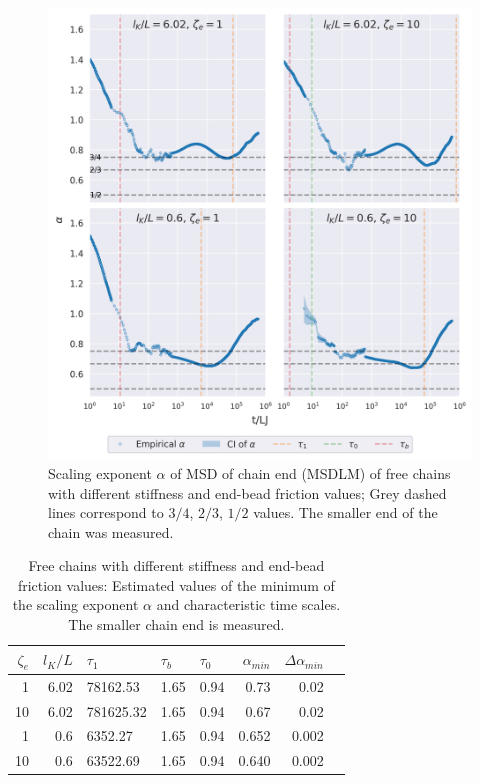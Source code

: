 \documentclass[
    paper=A4,pagesize=automedia,fontsize=12pt,
    BCOR=15mm,DIV=22,
    twoside,headinclude,footinclude=false,
    fleqn,             %
    bibliography=totocnumbered,          %
    listof=totoc,                %
    listof=flat,                 %
    cleardoublepage=empty      %
    numbers=endperiod
]{scrartcl}
\begin{document}
\begin{figure}
    \centering
    \includegraphics[width=\textwidth]{17+18+19+20-exp-alpha-fm.png}
    \caption{Scaling exponent $\alpha$ of MSD of chain end (MSDLM) 
    of free chains with different stiffness and end-bead friction values;
    Grey dashed lines correspond to $3/4$, $2/3$, $1/2$ values.
    The smaller end of the chain was measured. 
    }
    \label{fig:alpha_fm_free}
\end{figure}

\begin{table}[p]
    \centering
    
    \begin{tabular}{rrlllrrr}
        \toprule
        $\zeta_e$ & $l_K/L$ & $\tau_1$ & $\tau_b$ & $\tau_0$ & $\alpha_{min}$ & $\Delta \alpha_{min}$ \\
        \midrule
        1 & 6.02 & 78162.53 & 1.65 & 0.94 & 0.73 & 0.02 \\
        10 & 6.02 & 781625.32 & 1.65 & 0.94 & 0.67 & 0.02 \\
        1 & 0.6 & 6352.27 & 1.65 & 0.94 & 0.652 & 0.002 \\
        10 & 0.6 & 63522.69 & 1.65 & 0.94 & 0.640 & 0.002 \\
        \bottomrule
        \end{tabular}
    \caption{
        Free chains with different stiffness and end-bead friction values: 
        Estimated values of the minimum of the scaling exponent $\alpha$ and
        characteristic time scales. The smaller chain end is measured.
    }
    \label{table:free_chain_alpha_estimations_fm}
\end{table}
\end{document}

